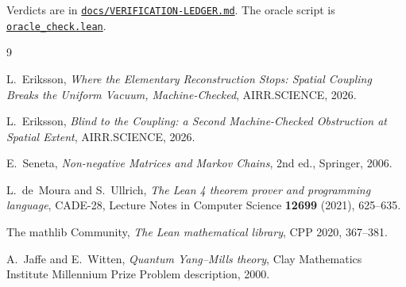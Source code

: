 \documentclass[11pt]{article}
\theoremstyle{definition}
\newcommand{\anchor}{08a9050201287a31d20fc4339cc5c6c64b1391fb}
\newcommand{\repofile}[2]{%
  \href{https://github.com/lluiseriksson/THE-ERIKSSON-PROGRAMME/blob/\anchor/#1}{\nolinkurl{#2}}}
\begin{document}
Verdicts are in
\repofile{docs/VERIFICATION-LEDGER.md}{docs/VERIFICATION-LEDGER.md}.  The oracle
script is \repofile{oracle\_check.lean}{oracle\_check.lean}.

\begin{thebibliography}{9}

L.~Eriksson,
\emph{Where the Elementary Reconstruction Stops: Spatial Coupling Breaks the
Uniform Vacuum, Machine-Checked}, AIRR.SCIENCE, 2026.

L.~Eriksson,
\emph{Blind to the Coupling: a Second Machine-Checked Obstruction at Spatial
Extent}, AIRR.SCIENCE, 2026.

E.~Seneta,
\emph{Non-negative Matrices and Markov Chains},
2nd ed., Springer, 2006.

L.~de~Moura and S.~Ullrich,
\emph{The Lean 4 theorem prover and programming language},
CADE-28, Lecture Notes in Computer Science \textbf{12699} (2021), 625--635.

The mathlib Community,
\emph{The Lean mathematical library},
CPP 2020, 367--381.

A.~Jaffe and E.~Witten,
\emph{Quantum Yang--Mills theory},
Clay Mathematics Institute Millennium Prize Problem description, 2000.

\end{thebibliography}
\end{document}
